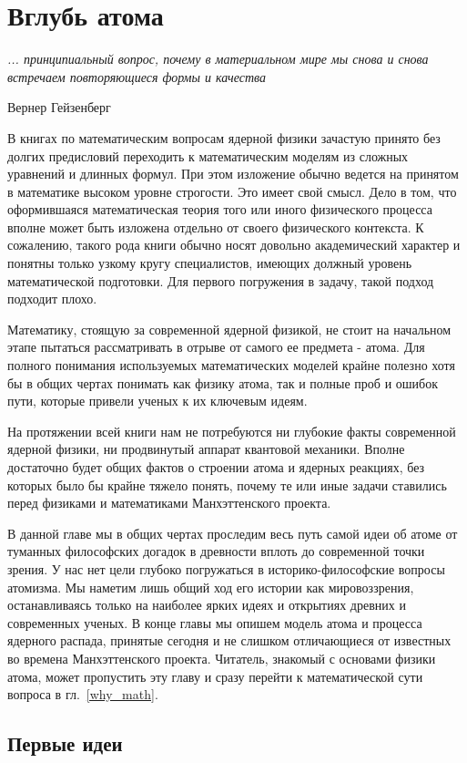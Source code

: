 \chapter{Вглубь атома}

\epigraph{\emph{... принципиальный вопрос, почему в материальном мире мы снова и снова встречаем повторяющиеся формы и качества}}
{Вернер Гейзенберг}

В книгах по математическим вопросам ядерной физики зачастую принято без долгих предисловий переходить к математическим моделям из сложных уравнений и длинных формул.
При этом изложение обычно ведется на принятом в математике высоком уровне строгости.
Это имеет свой смысл.
Дело в том, что оформившаяся математическая теория того или иного физического процесса вполне может быть изложена отдельно от своего физического контекста.
К сожалению, такого рода книги обычно носят довольно академический характер и понятны только узкому кругу специалистов, имеющих должный уровень математической подготовки. Для первого погружения в задачу, такой подход подходит плохо.

Математику, стоящую за современной ядерной физикой, не стоит на начальном этапе пытаться рассматривать в отрыве от самого ее предмета - атома.
Для полного понимания используемых математических моделей крайне полезно хотя бы в общих чертах понимать как физику атома, так и полные проб и ошибок пути, которые привели ученых к их ключевым идеям.
  
На протяжении всей книги нам не потребуются ни глубокие факты современной ядерной физики, ни продвинутый аппарат квантовой механики.
Вполне достаточно будет общих фактов о строении атома и ядерных реакциях, без которых было бы крайне тяжело понять, почему те или иные задачи ставились перед физиками и математиками Манхэттенского проекта.

В данной главе мы в общих чертах проследим весь путь самой идеи об атоме от туманных философских догадок в древности вплоть до современной точки зрения. 
У нас нет цели глубоко погружаться в историко-философские вопросы атомизма.
Мы наметим лишь общий ход его истории как мировоззрения, останавливаясь только на наиболее ярких идеях и открытиях древних и современных ученых.
В конце главы мы опишем модель атома и процесса ядерного распада, принятые сегодня и не слишком отличающиеся от известных во времена Манхэттенского проекта.
Читатель, знакомый с основами физики атома, может пропустить эту главу и сразу перейти к математической сути вопроса в гл.~\ref{why_math}.

\section*{Первые идеи}

